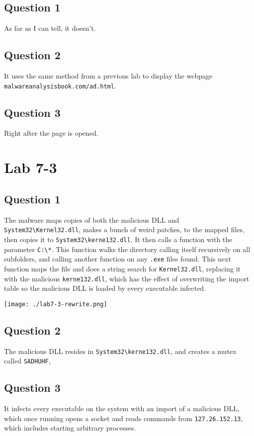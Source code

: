 \documentclass[11pt]{article}
\begin{document}
\subsection{Question 1}
\label{sec:org8c3c389}
As far as I can tell, it doesn't.
\subsection{Question 2}
\label{sec:org0424741}
It uses the same method from a previous lab to display the webpage
\texttt{malwareanalysisbook.com/ad.html}.
\subsection{Question 3}
\label{sec:org8d42f82}
Right after the page is opened.
\section{Lab 7-3}
\label{sec:org2473e02}
\subsection{Question 1}
\label{sec:orgc66a0e0}
The malware maps copies of both the malicious DLL and
\texttt{System32\textbackslash{}Kernel32.dll}, makes a bunch of weird patches, to the mapped
files, then copies it to \texttt{System32\textbackslash{}kerne132.dll}. It then calls a
function with the parameter \texttt{C:\textbackslash{}*}. This function walks the directory
calling itself recursively on all subfolders, and calling another
function on any \texttt{.exe} files found. This next function maps the file
and does a string search for \texttt{Kernel32.dll}, replacing it with the
malicious \texttt{kerne132.dll}, which has the effect of overwriting the
import table so the malicious DLL is loaded by every executable
infected.

\begin{center}
\texttt{[image: ./lab7-3-rewrite.png]}
\end{center}
\subsection{Question 2}
\label{sec:org6d27dd1}
The malicious DLL resides in \texttt{System32\textbackslash{}kerne132.dll}, and creates a
mutex called \texttt{SADHUHF},
\subsection{Question 3}
\label{sec:org245f3c1}
It infects every executable on the system with an import of a
malicious DLL, which once running opens a socket and reads commands
from \texttt{127.26.152.13}, which includes starting arbitrary processes.
\end{document}
